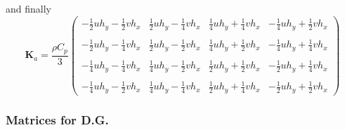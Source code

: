 and finally
\[
{\bm K}_a
=
\frac{\rho C_p}{3}
\left(
\begin{array}{cccc}
-\frac{1}{2} u h_y  -\frac{1}{2} v h_x & 
 \frac{1}{2} u h_y  -\frac{1}{4} v h_x & 
 \frac{1}{4} u h_y  +\frac{1}{4} v h_x & 
-\frac{1}{4} u h_y  +\frac{1}{2} v h_x \\ \\
-\frac{1}{2} u h_y  -\frac{1}{4} v h_x & 
 \frac{1}{2} u h_y  -\frac{1}{2} v h_x & 
 \frac{1}{4} u h_y  +\frac{1}{2} v h_x & 
-\frac{1}{4} u h_y  +\frac{1}{4} v h_x \\ \\
-\frac{1}{4} u h_y  -\frac{1}{4} v h_x & 
 \frac{1}{4} u h_y  -\frac{1}{2} v h_x & 
 \frac{1}{2} u h_y  +\frac{1}{2} v h_x & 
-\frac{1}{2} u h_y  +\frac{1}{4} v h_x \\ \\
-\frac{1}{4} u h_y  -\frac{1}{2} v h_x & 
 \frac{1}{4} u h_y  -\frac{1}{4} v h_x & 
 \frac{1}{2} u h_y  +\frac{1}{4} v h_x & 
-\frac{1}{2} u h_y  +\frac{1}{2} v h_x 
\end{array}
\right)
\]









\subsubsection{Matrices for D.G.}

